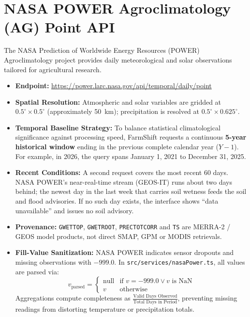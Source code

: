\documentclass[11pt,a4paper]{report}
\begin{document}
\section{NASA POWER Agroclimatology (AG) Point API}
The NASA Prediction of Worldwide Energy Resources (POWER) Agroclimatology project provides daily meteorological and solar observations tailored for agricultural research.
\begin{itemize}
  \item \textbf{Endpoint:} \url{https://power.larc.nasa.gov/api/temporal/daily/point}
  \item \textbf{Spatial Resolution:} Atmospheric and solar variables are gridded at $0.5^\circ \times 0.5^\circ$ (approximately 50~km); precipitation is resolved at $0.5^\circ \times 0.625^\circ$.
  \item \textbf{Temporal Baseline Strategy:} To balance statistical climatological significance against processing speed, FarmShift requests a continuous \textbf{5-year historical window} ending in the previous complete calendar year ($Y-1$). For example, in 2026, the query spans January 1, 2021 to December 31, 2025.
  \item \textbf{Recent Conditions:} A second request covers the most recent 60 days. NASA POWER's near-real-time stream (GEOS-IT) runs about two days behind; the newest day in the last week that carries soil wetness feeds the soil and flood advisories. If no such day exists, the interface shows ``data unavailable'' and issues no soil advisory.
  \item \textbf{Provenance:} \texttt{GWETTOP}, \texttt{GWETROOT}, \texttt{PRECTOTCORR} and \texttt{TS} are MERRA-2 / GEOS model products, not direct SMAP, GPM or MODIS retrievals.
  \item \textbf{Fill-Value Sanitization:} NASA POWER indicates sensor dropouts and missing observations with $-999.0$. In \texttt{src/services/nasaPower.ts}, all values are parsed via:
  \begin{equation}
    v_{\text{parsed}} = \begin{cases} \text{null} & \text{if } v = -999.0 \lor v \text{ is NaN} \\ v & \text{otherwise} \end{cases}
  \end{equation}
  Aggregations compute completeness as $\frac{\text{Valid Days Observed}}{\text{Total Days in Period}}$, preventing missing readings from distorting temperature or precipitation totals.
\end{itemize}
\end{document}
